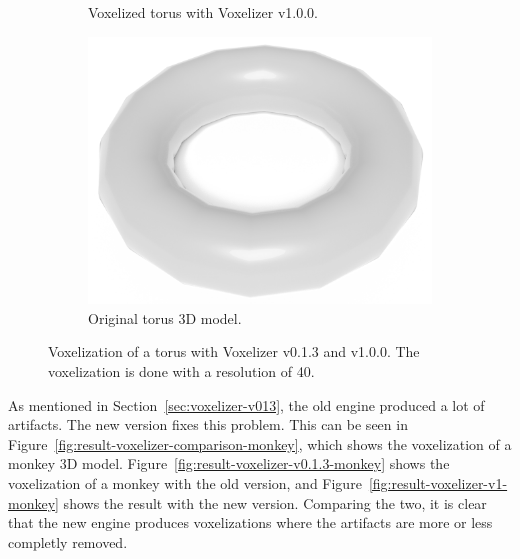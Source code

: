 \begin{figure}[htp]
\begin{subfigure}[b]{0.49\textwidth}
        \caption{Voxelized torus with Voxelizer v1.0.0.}
        \label{fig:result-voxelizer-v1-torus}
    \end{subfigure}
    \par\bigskip
    \begin{subfigure}[b]{0.49\textwidth}
        \centering
        \includegraphics[width=\textwidth]{sections/theory/figures/torus.png}
        \caption{Original torus 3D model.}
        \label{fig:result-original-torus}
    \end{subfigure}
    \caption{Voxelization of a torus with Voxelizer v0.1.3 and v1.0.0. The voxelization is done with a resolution of 40.}
    \label{fig:result-voxelizer-comparison-torus}
\end{figure}
\clearpage
As mentioned in Section~\ref{sec:voxelizer-v013}, the old engine produced a lot of artifacts. The new version fixes this problem. This can be seen in Figure~\ref{fig:result-voxelizer-comparison-monkey}, which shows the voxelization of a monkey 3D model. Figure~\ref{fig:result-voxelizer-v0.1.3-monkey} shows the voxelization of a monkey with the old version, and Figure~\ref{fig:result-voxelizer-v1-monkey} shows the result with the new version. Comparing the two, it is clear that the new engine produces voxelizations where the artifacts are more or less completly removed.
